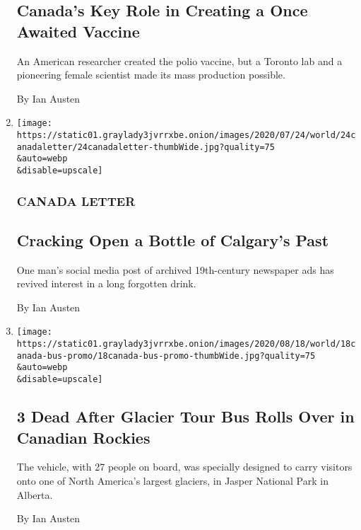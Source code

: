 \begin{enumerate}
{  \subsection{Canada's Key Role in Creating a Once Awaited
  Vaccine}\label{canadas-key-role-in-creating-a-once-awaited-vaccine}}

  An American researcher created the polio vaccine, but a Toronto lab
  and a pioneering female scientist made its mass production possible.

  By Ian Austen
\item
  \href{/2020/07/24/world/canada/cronk.html}{}

  \texttt{[image: https://static01.graylady3jvrrxbe.onion/images/2020/07/24/world/24canadaletter/24canadaletter-thumbWide.jpg?quality=75\\\&auto=webp\\\&disable=upscale]}

  \hypertarget{canada-letter-3}{%
  \subsubsection{CANADA LETTER}\label{canada-letter-3}}

  \hypertarget{cracking-open-a-bottle-of-calgarys-past}{%
  \subsection{Cracking Open a Bottle of Calgary's
  Past}\label{cracking-open-a-bottle-of-calgarys-past}}

  One man's social media post of archived 19th-century newspaper ads has
  revived interest in a long forgotten drink.

  By Ian Austen
\item
  \href{/2020/07/18/world/canada/bus-crash-glacier-jasper-alberta.html}{}

  \texttt{[image: https://static01.graylady3jvrrxbe.onion/images/2020/08/18/world/18canada-bus-promo/18canada-bus-promo-thumbWide.jpg?quality=75\\\&auto=webp\\\&disable=upscale]}

  \hypertarget{3-dead-after-glacier-tour-bus-rolls-over-in-canadian-rockies}{%
  \subsection{3 Dead After Glacier Tour Bus Rolls Over in Canadian
  Rockies}\label{3-dead-after-glacier-tour-bus-rolls-over-in-canadian-rockies}}

  The vehicle, with 27 people on board, was specially designed to carry
  visitors onto one of North America's largest glaciers, in Jasper
  National Park in Alberta.

  By Ian Austen
\end{enumerate}

